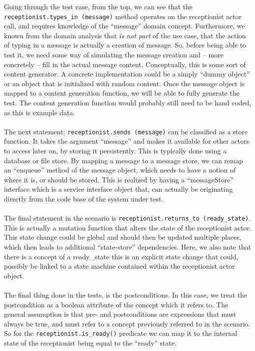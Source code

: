 Going through the test case, from the top, we can see that the \texttt{receptionist.types\_in~(message)} method operates on the receptionist actor call, and requires knowledge of the ``message'' domain concept. Furthermore, we known from the domain analysis that \emph{is not part} of the use case, that the action of typing in a message is actually a creation of message. So, before being able to test it, we need some way of simulating the message creation and -- more concretely -- fill in the actual message content. Conceptually, this is some sort of content generator. A concrete implementation could be a simply ``dummy object'' or an object that is initialized with random content. Once the message object is mapped to a content generation function, we will be able to fully generate the test. The content generation function would probably still need to be hand coded, as this is example data.\\\\
The next statement; \texttt{receptionist.sends (message)} can be classified as a store function. It takes the argument ``message'' and makes it available for other actors to access later on, by storing it persistently. This is typically done using a database or file store. By mapping a message to a message store, we can remap an ``enqueue'' method of the message object, which needs to have a notion of where it is, or should be stored. This is realized by having a ``messageStore'' interface which is a service interface object that, can actually be originating directly from the code base of the system under test.\\\\
The final statement in the scenario is \texttt{receptionist.returns\_to (ready\_state)}. This is actually a mutation function that alters the state of the receptionist actor. This state change could be global and should then  be updated multiple places, which then leads to additional ``state-store'' dependencies. Here, we also note that there is a concept of a ready\_state this is an explicit state change that could, possibly be linked to a state machine contained within the receptionist actor object.\\\\
The final thing done in the tests, is the postconditions. In this case, we treat the postcondition as a boolean attribute of the concept which it refers to. The general assumption is that pre- and postconditions are expressions that must always be true, and must refer to a concept previously referred to in the scenario. So for the \texttt{receptionist.is\_ready()} predicate we can map it to the internal state of the receptionist being equal to the ``ready'' state.\\\\
